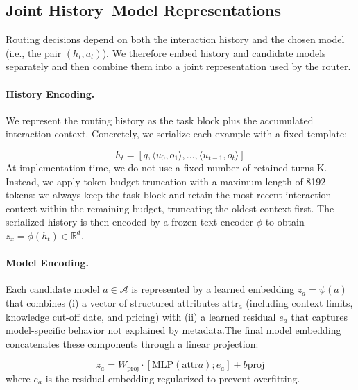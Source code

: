 \subsection{Joint History--Model Representations}
\label{sec:representations}

Routing decisions depend on both the interaction history and the chosen model (i.e., the pair $(h_t,a_t)$). We therefore embed history and candidate models separately and then combine them into a joint representation used by the router.

\paragraph{History Encoding.}
We represent the routing history as the task block plus the accumulated interaction context. Concretely, we serialize each example with a fixed template:

\begin{equation}
{\textstyle h_t = [q,\langle u_0,o_1\rangle,\ldots,\langle u_{t-1},o_t\rangle]}
\end{equation}
At implementation time, we do not use a fixed number of retained turns K. Instead, we apply token-budget truncation with a maximum length of 8192 tokens: we always keep the task block and retain the most recent interaction context within the remaining budget, truncating the oldest context first. The serialized history is then encoded by a frozen text encoder $\phi$ to obtain $z_x=\phi(h_t)\in\mathbb{R}^d$. 


\paragraph{Model Encoding.}
Each candidate model $a \in \mathcal{A}$ is represented by a learned embedding $z_a=\psi(a)$ that combines (i) a vector of structured attributes $\text{attr}_a$ (including context limits, knowledge cut-off date, and pricing) with (ii) a learned residual $e_a$ that captures model-specific behavior not explained by metadata.The final model embedding concatenates these components through a linear projection:

\begin{equation}
z_a = W_{\text{proj}} \cdot [\text{MLP}(\text{attr}a); e_a] + b{\text{proj}}
\end{equation}
where $e_a$ is the residual embedding regularized to prevent overfitting.

